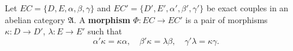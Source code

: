 Let $EC = \{D, E, \alpha, \beta, \gamma\}$ and $EC' = \{D', E', \alpha', \beta', \gamma'\}$ be exact couples in an abelian category $\mathfrak{A}$. A \textbf{morphism} $\Phi: EC \to EC'$ is a pair of morphisms $\kappa: D \to D'$, $\lambda: E \to E'$ such that
$$\alpha' \kappa = \kappa \alpha, \quad \beta' \kappa = \lambda \beta, \quad \gamma' \lambda = \kappa \gamma.$$
